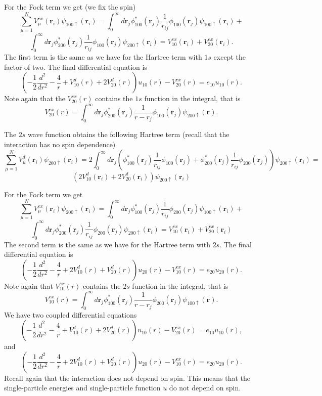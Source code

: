 For the Fock term we get (we fix the spin)
\[
  \sum_{\mu=1}^NV_{\mu}^{ex}(\mathbf{r}_i)\psi_{100\uparrow}(\mathbf{r}_i)=
\int_0^{\infty}d\mathbf{r}_j\phi_{100}^*(\mathbf{r}_j) 
  \frac{1}{r_{ij}}\phi_{100}(\mathbf{r}_j)\psi_{100\uparrow}(\mathbf{r}_i)+  \]
\[
\int_0^{\infty}d\mathbf{r}_j\phi_{200}^*(\mathbf{r}_j) 
  \frac{1}{r_{ij}}\phi_{100}(\mathbf{r}_j) \psi_{200\uparrow}(\mathbf{r}_i)=V_{10}^{ex}(\mathbf{r}_i)+V_{20}^{ex}(\mathbf{r}_i).
\] 
The first term is the same as we have for the Hartree term with $1s$ except the factor of two.
The final differential equation is
\[
  \left(-\frac{1}{2} \frac{d^2}{dr^2}-\frac{4}{r}+ V_{10}^{d}(r)+2V_{20}^d(r)\right ) u_{10}(r)-V_{20}^{ex}(r)  = e_{10} u_{10}(r). 
\]
Note again that the $V_{20}^{ex}(r)$ contains the $1s$ function in the integral, that is 
\[
V_{20}^{ex}(r)=\int_0^{\infty}d\mathbf{r}_j\phi_{200}^*(\mathbf{r}_j)\frac{1}{r-r_j}\phi_{100}(\mathbf{r}_j) \psi_{200\uparrow}(\mathbf{r}).
\]

The $2s$ wave function obtains the following Hartree term  (recall that the interaction has no spin dependence)
\[
  \sum_{\mu=1}^NV_{\mu}^{d}(\mathbf{r}_i)\psi_{200\uparrow}(\mathbf{r}_i)=2\int_0^{\infty}d\mathbf{r}_j\left( \phi_{100}^*(\mathbf{r}_j) 
  \frac{1}{r_{ij}}\phi_{100}(\mathbf{r}_j)+\phi_{200}^*(\mathbf{r}_j) 
  \frac{1}{r_{ij}}\phi_{200}(\mathbf{r}_j) \right)\psi_{200\uparrow}(\mathbf{r}_i)=
\]
\[
(2V_{10}^d(\mathbf{r}_i)+2V_{20}^d(\mathbf{r}_i))\psi_{200\uparrow}(\mathbf{r}_i)
\] 

For the Fock term we get 
\[
  \sum_{\mu=1}^NV_{\mu}^{ex}(\mathbf{r}_i)\psi_{200\uparrow}(\mathbf{r}_i)=
\int_0^{\infty}d\mathbf{r}_j\phi_{100}^*(\mathbf{r}_j) 
  \frac{1}{r_{ij}}\phi_{200}(\mathbf{r}_j)\psi_{100\uparrow}(\mathbf{r}_i)+ 
\]
\[
\int_0^{\infty}d\mathbf{r}_j\phi_{200}^*(\mathbf{r}_j) 
  \frac{1}{r_{ij}}\phi_{200}(\mathbf{r}_j)\psi_{200\uparrow}(\mathbf{r}_i)= V_{10}^{ex}(\mathbf{r}_i)+V_{20}^{ex}(\mathbf{r}_i) \] 
The second term is the same as we have for the Hartree term with $2s$.
The final differential equation is
\[
  \left(-\frac{1}{2} \frac{d^2}{dr^2}-\frac{4}{r}+ 2V_{10}^{d}(r)+V_{20}^d(r)\right ) u_{20}(r)-V_{10}^{ex}(r)  = e_{20} u_{20}(r). 
\]
Note again that $V_{10}^{ex}(r)$ contains the $2s$ function in the integral, that is 
\[
V_{10}^{ex}(r)=\int_0^{\infty}d\mathbf{r}_j\phi_{100}^*(\mathbf{r}_j)\frac{1}{r-r_j}\phi_{200}(\mathbf{r}_j) \psi_{100\uparrow}(\mathbf{r}).
\]
We have  two coupled differential equations
\[
  \left(-\frac{1}{2} \frac{d^2}{dr^2}-\frac{4}{r}+ V_{10}^{d}(r)+2V_{20}^d(r)\right ) u_{10}(r)-V_{20}^{ex}(r)  = e_{10} u_{10}(r), 
\] 
and
\[
  \left(-\frac{1}{2} \frac{d^2}{dr^2}-\frac{4}{r}+ 2V_{10}^{d}(r)+V_{20}^d(r)\right ) u_{20}(r)-V_{10}^{ex}(r)  = e_{20} u_{20}(r). 
\]
Recall again that the interaction does not depend  on spin. This means that the single-particle energies and single-particle function 
$u$ do not depend on spin.  

